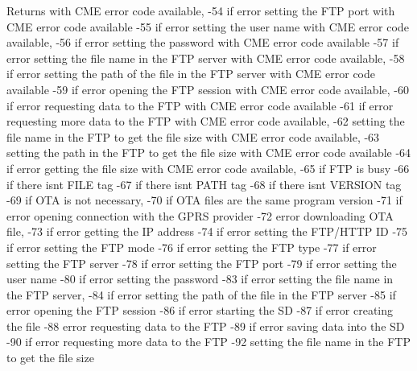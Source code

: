 \begin{DoxyReturn}{Returns}
with C\+ME error code available, \textquotesingle{}-\/54\textquotesingle{} if error setting the F\+TP port with C\+ME error code available \textquotesingle{}-\/55\textquotesingle{} if error setting the user name with C\+ME error code available, \textquotesingle{}-\/56\textquotesingle{} if error setting the password with C\+ME error code available \textquotesingle{}-\/57\textquotesingle{} if error setting the file name in the F\+TP server with C\+ME error code available, \textquotesingle{}-\/58\textquotesingle{} if error setting the path of the file in the F\+TP server with C\+ME error code available \textquotesingle{}-\/59\textquotesingle{} if error opening the F\+TP session with C\+ME error code available, \textquotesingle{}-\/60\textquotesingle{} if error requesting data to the F\+TP with C\+ME error code available \textquotesingle{}-\/61\textquotesingle{} if error requesting more data to the F\+TP with C\+ME error code available, \textquotesingle{}-\/62 setting the file name in the F\+TP to get the file size with C\+ME error code available, \textquotesingle{}-\/63\textquotesingle{} setting the path in the F\+TP to get the file size with C\+ME error code available \textquotesingle{}-\/64\textquotesingle{} if error getting the file size with C\+ME error code available, \textquotesingle{}-\/65\textquotesingle{} if F\+TP is busy \textquotesingle{}-\/66\textquotesingle{} if there isn\textquotesingle{}t F\+I\+LE tag \textquotesingle{}-\/67\textquotesingle{} if there isn\textquotesingle{}t P\+A\+TH tag \textquotesingle{}-\/68\textquotesingle{} if there isn\textquotesingle{}t V\+E\+R\+S\+I\+ON tag \textquotesingle{}-\/69\textquotesingle{} if O\+TA is not necessary, \textquotesingle{}-\/70\textquotesingle{} if O\+TA files are the same program version \textquotesingle{}-\/71\textquotesingle{} if error opening connection with the G\+P\+RS provider \textquotesingle{}-\/72\textquotesingle{} error downloading O\+TA file, \textquotesingle{}-\/73\textquotesingle{} if error getting the IP address \textquotesingle{}-\/74\textquotesingle{} if error setting the F\+T\+P/\+H\+T\+TP ID \textquotesingle{}-\/75\textquotesingle{} if error setting the F\+TP mode \textquotesingle{}-\/76\textquotesingle{} if error setting the F\+TP type \textquotesingle{}-\/77\textquotesingle{} if error setting the F\+TP server \textquotesingle{}-\/78\textquotesingle{} if error setting the F\+TP port \textquotesingle{}-\/79\textquotesingle{} if error setting the user name \textquotesingle{}-\/80\textquotesingle{} if error setting the password \textquotesingle{}-\/83\textquotesingle{} if error setting the file name in the F\+TP server, \textquotesingle{}-\/84\textquotesingle{} if error setting the path of the file in the F\+TP server \textquotesingle{}-\/85\textquotesingle{} if error opening the F\+TP session \textquotesingle{}-\/86\textquotesingle{} if error starting the SD \textquotesingle{}-\/87\textquotesingle{} if error creating the file \textquotesingle{}-\/88\textquotesingle{} error requesting data to the F\+TP \textquotesingle{}-\/89\textquotesingle{} if error saving data into the SD \textquotesingle{}-\/90\textquotesingle{} if error requesting more data to the F\+TP \textquotesingle{}-\/92\textquotesingle{} setting the file name in the F\+TP to get the file size 
\end{DoxyReturn}
